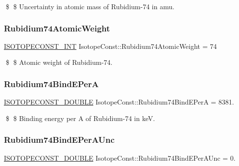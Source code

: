 \$ \$ Uncertainty in atomic mass of Rubidium-\/74 in amu. \mbox{\label{group___isotope_const-_rubidium-_rb74_gaab55691a28fdd0fc22fc492e5da15d46}} 
\subsubsection{\texorpdfstring{Rubidium74\+Atomic\+Weight}{Rubidium74AtomicWeight}}
{\footnotesize\ttfamily \mbox{\hyperlink{group___isotope_const-_macros_ga5f18360b3e99483a35c32d789e62621c}{I\+S\+O\+T\+O\+P\+E\+C\+O\+N\+S\+T\+\_\+\+I\+NT}} Isotope\+Const\+::\+Rubidium74\+Atomic\+Weight = 74}

\$ \$ Atomic weight of Rubidium-\/74. \mbox{\label{group___isotope_const-_rubidium-_rb74_ga3e6a800611996167bde3b36f445f5d3a}} 
\subsubsection{\texorpdfstring{Rubidium74\+Bind\+E\+PerA}{Rubidium74BindEPerA}}
{\footnotesize\ttfamily \mbox{\hyperlink{group___isotope_const-_macros_ga8f45a7272ce02c0b4c65c44636ed719a}{I\+S\+O\+T\+O\+P\+E\+C\+O\+N\+S\+T\+\_\+\+D\+O\+U\+B\+LE}} Isotope\+Const\+::\+Rubidium74\+Bind\+E\+PerA = 8381.}

\$ \$ Binding energy per A of Rubidium-\/74 in keV. \mbox{\label{group___isotope_const-_rubidium-_rb74_gaa6c80d9f6361ef75a78902f05a72d088}} 
\subsubsection{\texorpdfstring{Rubidium74\+Bind\+E\+Per\+A\+Unc}{Rubidium74BindEPerAUnc}}
{\footnotesize\ttfamily \mbox{\hyperlink{group___isotope_const-_macros_ga8f45a7272ce02c0b4c65c44636ed719a}{I\+S\+O\+T\+O\+P\+E\+C\+O\+N\+S\+T\+\_\+\+D\+O\+U\+B\+LE}} Isotope\+Const\+::\+Rubidium74\+Bind\+E\+Per\+A\+Unc = 0.}


